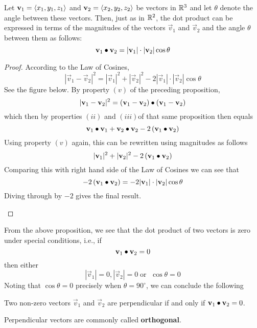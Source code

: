 \documentclass[handout]{ximera}
\begin{document}
\begin{proposition}
Let $\mathbf{v}_1 = \left\langle x_1, y_1, z_1\right\rangle$ and $\mathbf{v}_2 = \left\langle x_2, y_2, z_2\right\rangle$
be vectors in $\mathbb R^3$ and let $\theta$ denote the angle between these vectors.  Then, just as in $\mathbb R^2$, the dot product can be expressed in terms of the 
magnitudes of the vectors $\vec{v}_1$ and $\vec{v}_2$ and the angle $\theta$ between them as follows:
\[
\mathbf{v}_1\bullet\mathbf{v}_2 = |\mathbf{v}_1|\cdot |\mathbf{v}_2| \cos\theta
\]
\begin{proof}
According to the Law of Cosines, 
\[
|\vec{v}_1 - \vec{v}_2|^2 = |\vec{v}_1|^2 + |\vec{v}_2|^2 - 2|\vec{v}_1|\cdot| \vec{v}_2|\cos \theta
\]
See the figure below. By property $(v)$ of the preceding proposition, 
\[
|\mathbf{v}_1 - \mathbf{v}_2|^2 = \left(\mathbf{v}_1 - \mathbf{v}_2\right)\bullet \left(\mathbf{v}_1 - \mathbf{v}_2\right)
\]
which then by properties $(ii)$ and $(iii)$of that same proposition then equals
\[
\mathbf{v}_1 \bullet \mathbf{v}_1 + \mathbf{v}_2 \bullet \mathbf{v}_2 - 2\left(\mathbf{v}_1 \bullet \mathbf{v}_2\right)
\]
Using property $(v)$ again, this can be rewritten using magnitudes as follows
\[
|\mathbf{v}_1|^2 + |\mathbf{v}_2|^2 - 2\left(\mathbf{v}_1 \bullet \mathbf{v}_2\right)
\]
Comparing this with right hand side of the Law of Cosines we can see that
\[
- 2\left(\mathbf{v}_1 \bullet \mathbf{v}_2\right) = - 2|\mathbf{v}_1|\cdot| \mathbf{v}_2|\cos \theta
\]
Diving through by $-2$ gives the final result.

\begin{image}
\end{image}

\end{proof}

\end{proposition}

From the above proposition, we see that the dot product of two vectors is zero under special conditions, i.e.,  if 
\[
\mathbf{v}_1 \bullet \mathbf{v}_2 = 0
\]
then either
\[
|\vec{v}_1| = 0, |\vec{v}_2| = 0 \; \text{or } \; \cos \theta = 0
\]
Noting that $\cos \theta = 0$ precisely when $\theta = 90^\circ$, we can conclude the following
\begin{corollary} 
Two non-zero vectors $\vec{v}_1$ and $\vec{v}_2$ are perpendicular if and only if $\mathbf{v}_1 \bullet \mathbf{v}_2 = 0$.
\end{corollary}
Perpendicular vectors are commonly called {\bf orthogonal}.\\
\end{document}
